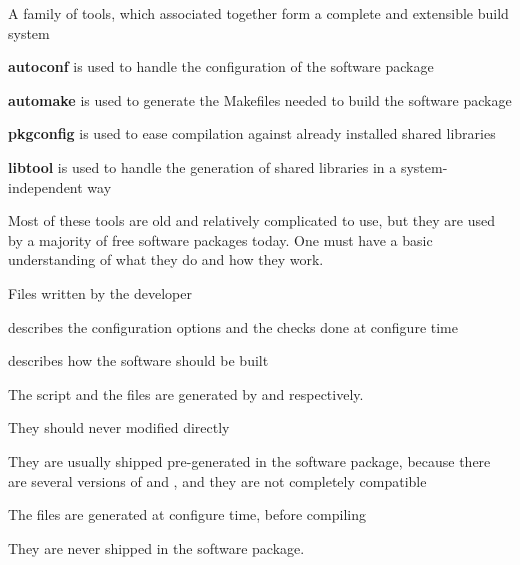   \startitemize
  \item A family of tools, which associated together form a complete
    and extensible build system
    \startitemize
    \item {\bf autoconf} is used to handle the configuration of the
      software package
    \item {\bf automake} is used to generate the Makefiles needed to
      build the software package
    \item {\bf pkgconfig} is used to ease compilation against already
      installed shared libraries
    \item {\bf libtool} is used to handle the generation of shared
      libraries in a system-independent way
    \stopitemize
  \item Most of these tools are old and relatively complicated to use,
    but they are used by a majority of free software packages
    today. One must have a basic understanding of what they do and how
    they work.
  \stopitemize


  \startitemize
  \item Files written by the developer
    \startitemize
    \item {} describes the configuration options and
      the checks done at configure time
    \item {} describes how the software should be
      built
    \stopitemize
  \item The  script and the  files
    are generated by  and  respectively.
    \startitemize
    \item They should never modified directly
    \item They are usually shipped pre-generated in the software
      package, because there are several versions of 
      and , and they are not completely compatible
    \stopitemize
  \item The  files are generated at configure time, before
    compiling
    \startitemize
    \item They are never shipped in the software package.
    \stopitemize
  \stopitemize

